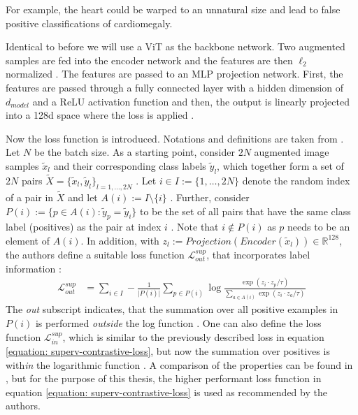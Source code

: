 For example, the heart could be warped to an unnatural size and lead to false positive classifications of cardiomegaly.
\par
Identical to before we will use a ViT as the backbone network.
Two augmented samples are fed into the encoder network and the features are then $\ell_2$ normalized \citep{Khosla2020}.
The features are passed to an MLP projection network.
First, the features are passed through a fully connected layer with a hidden dimension of $d_{model}$ and a ReLU activation function and then, the output is linearly projected into a 128d space where the loss is applied \citep{Khosla2020}.
\par
Now the loss function is introduced.
Notations and definitions are taken from \citep{Khosla2020}.
Let $N$ be the batch size.
As a starting point, consider $2N$ augmented image samples $\tilde{x}_l$ and their corresponding class labels $\tilde{y}_l$, which together form a set of $2N$ pairs $\tilde{X} = \{\tilde{x}_l, \tilde{y}_l\}_{l=1,\dots,2N}$ \citep{Khosla2020}.
Let $i \in I:=\{1,\dots,2N\}$ denote the random index of a pair in $\tilde{X}$ and let $A(i):=I\setminus \{i\}$ \citep{Khosla2020}.
Further, consider $P(i):=\{p\in A(i): \tilde{y}_p = \tilde{y}_i\}$ to be the set of all pairs that have the same class label (positives) as the pair at index $i$ \citep{Khosla2020}.
Note that $i \not \in P(i)$ as $p$ needs to be an element of $A(i)$.   
In addition, with $z_{l} := Projection(Encoder(\tilde{x}_l)) \in \mathbb{R}^{128}$, the authors define a suitable loss function $\mathcal{L}_{out}^{sup}$, that incorporates label information \citep{Khosla2020}:
\begin{align}
	\mathcal{L}_{out}^{sup} &= \sum_{i\in I} -\frac{1}{\vert P(i) \vert} \sum_{p\in P(i)} \log \frac{\exp(z_i \cdot z_p/\tau)}{\sum_{a \in A(i)}\exp(z_i \cdot z_a/\tau)}
	\label{equation: superv-contrastive-loss}
\end{align}
The \textit{out} subscript indicates, that the summation over all positive examples in $P(i)$ is performed \textit{outside} the log function \citep{Khosla2020}.
One can also define the loss function $\mathcal{L}_{in}^{sup}$, which is similar to the previously described loss in equation \ref{equation: superv-contrastive-loss}, but now the summation over positives is with\textit{in} the logarithmic function \citep{Khosla2020}.
A comparison of the properties can be found in \citep{Khosla2020}, but for the purpose of this thesis, the higher performant loss function in equation \ref{equation: superv-contrastive-loss} is used as recommended by the authors.
